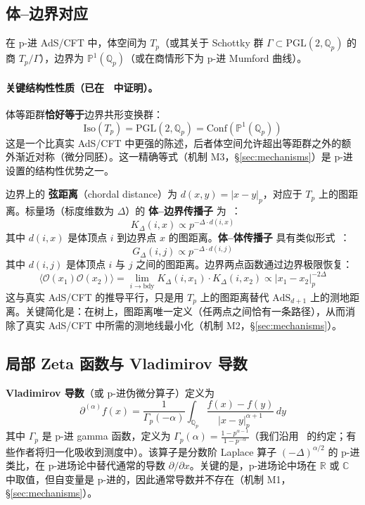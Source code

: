 \documentclass[11pt,a4paper]{ctexart}
\theoremstyle{remark}
\newcommand{\Qp}{\mathbb{Q}_p}
\newcommand{\R}{\mathbb{R}}
\newcommand{\C}{\mathbb{C}}
\newcommand{\Pone}{\mathbb{P}^1}
\newcommand{\Tp}{T_p}
\newcommand{\PGL}{\mathrm{PGL}}
\newcommand{\AdS}{\mathrm{AdS}}
\newcommand{\Conf}{\mathrm{Conf}}
\newcommand{\Iso}{\mathrm{Iso}}
\newcommand{\dpartial}{\partial^{(\alpha)}}
\newcommand{\OO}{\mathcal{O}}
\newcommand{\GG}{G_\Delta}
\newcommand{\KK}{K_\Delta}
\newcommand{\normp}[1]{|#1|_p}
\begin{document}
\subsection{体--边界对应}

在 p-进 AdS/CFT 中，体空间为 $\Tp$（或其关于 Schottky 群 $\Gamma \subset \PGL(2, \Qp)$ 的商 $\Tp/\Gamma$），边界为 $\Pone(\Qp)$（或在商情形下为 p-进 Mumford 曲线）。

\paragraph{关键结构性性质（已在~\cite{HMSS16} 中证明）。}
体等距群\textbf{恰好等于}边界共形变换群：
\begin{equation}
\Iso(\Tp) = \PGL(2, \Qp) = \Conf(\Pone(\Qp))
\end{equation}
这是一个比真实 AdS/CFT 中更强的陈述，后者体空间允许超出等距群之外的额外渐近对称（微分同胚）。这一精确等式（机制 M3，\S\ref{sec:mechanisms}）是 p-进设置的结构性优势之一。

边界上的 \textbf{弦距离}（chordal distance）为 $d(x,y) = \normp{x-y}$，对应于 $\Tp$ 上的图距离。标量场（标度维数为 $\Delta$）的 \textbf{体--边界传播子} 为~\cite{G16,HMSS16}：
\begin{equation}
\KK(i, x) \propto p^{-\Delta \cdot d(i, x)}
\end{equation}
其中 $d(i,x)$ 是体顶点 $i$ 到边界点 $x$ 的图距离。\textbf{体--体传播子} 具有类似形式~\cite{GP17}：
\begin{equation}
\GG(i, j) \propto p^{-\Delta \cdot d(i, j)}
\end{equation}
其中 $d(i,j)$ 是体顶点 $i$ 与 $j$ 之间的图距离。边界两点函数通过边界极限恢复：
\begin{equation}
\langle \OO(x_1) \OO(x_2) \rangle = \lim_{i \to \mathrm{bdy}} \KK(i, x_1) \cdot \KK(i, x_2) \propto \normp{x_1 - x_2}^{-2\Delta}
\end{equation}
这与真实 AdS/CFT 的推导平行，只是用 $\Tp$ 上的图距离替代 $\AdS_{d+1}$ 上的测地距离。关键简化是：在树上，图距离唯一定义（任两点之间恰有一条路径），从而消除了真实 AdS/CFT 中所需的测地线最小化（机制 M2，\S\ref{sec:mechanisms}）。

\subsection{局部 Zeta 函数与 Vladimirov 导数}

\textbf{Vladimirov 导数}（或 p-进伪微分算子）定义为
\begin{equation}
\dpartial f(x) = \frac{1}{\Gamma_p(-\alpha)} \int_{\Qp} \frac{f(x) - f(y)}{\normp{x-y}^{\alpha+1}} \, dy
\end{equation}
其中 $\Gamma_p$ 是 p-进 gamma 函数，定义为 $\Gamma_p(\alpha) = \frac{1 - p^{\alpha-1}}{1 - p^{-\alpha}}$（我们沿用~\cite{HSYZ20} 的约定；有些作者将归一化吸收到测度中）。该算子是分数阶 Laplace 算子 $(-\Delta)^{\alpha/2}$ 的 p-进类比，在 p-进场论中替代通常的导数 $\partial/\partial x$。关键的是，p-进场论中场在 $\R$ 或 $\C$ 中取值，但自变量是 p-进的，因此通常导数并不存在（机制 M1，\S\ref{sec:mechanisms}）。
\end{document}
